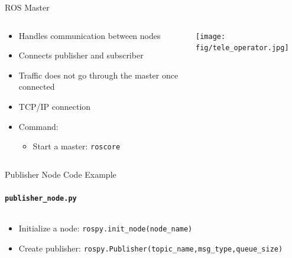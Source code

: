 \documentclass[aspectratio=43]{beamer}
\newcommand{\pyinline}[1]{\texttt{#1}}
\newcommand{\inline}[1]{\texttt{#1}}
\begin{document}
\begin{frame}{ROS Master}
	\begin{columns}[T]
		\begin{column}{0.6\textwidth}
			\begin{itemize}
			\item Handles communication between nodes
			\item Connects publisher and subscriber
			\item Traffic does \alert{not} go through the master once connected
			\item TCP/IP connection
			\item Command:
				\begin{itemize}
					\item Start a master: \inline{roscore}
				\end{itemize}
			\end{itemize}
		\end{column}
		\begin{column}{0.4\textwidth}
			\centering
			\texttt{[image: fig/tele\_operator.jpg]}
		\end{column}
	\end{columns}
\end{frame}

\begin{frame}{Publisher Node Code Example}
	\framesubtitle{\texttt{publisher\_node.py}}
	\inputminted{python}{snippet/publisher_node.py}
	\begin{itemize}
		\item Initialize a node: \pyinline{rospy.init_node(node_name)}
		\item Create publisher: \pyinline{rospy.Publisher(topic_name,msg_type,queue_size)}
	\end{itemize}
\end{frame}
\end{document}
